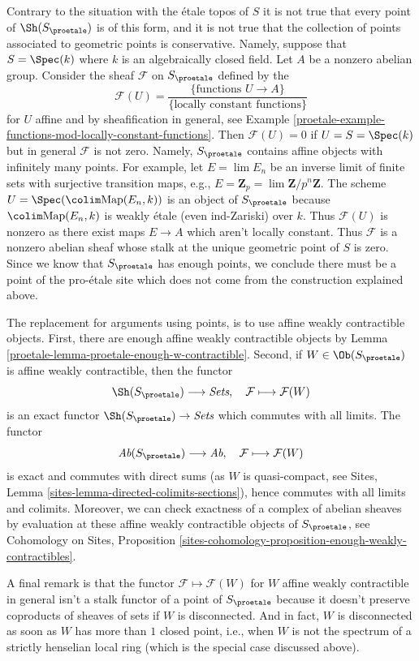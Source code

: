 Contrary to the situation with the \'etale topos of $S$ it is not true
that every point of $\Sh(S_\proetale)$ is of this form, and it is not
true that the collection of points associated to geometric points is
conservative. Namely, suppose that $S = \Spec(k)$ where $k$ is an
algebraically closed field. Let $A$ be a nonzero abelian group.
Consider the sheaf $\mathcal{F}$ on $S_\proetale$ defined by the
$$
\mathcal{F}(U) =
\frac{\{\text{functions }U \to A\}}{\{\text{locally constant functions}\}}
$$
for $U$ affine and by sheafification in general, see
Example \ref{proetale-example-functions-mod-locally-constant-functions}.
Then $\mathcal{F}(U) = 0$ if $U = S = \Spec(k)$ but in general $\mathcal{F}$
is not zero. Namely, $S_\proetale$ contains affine objects
with infinitely many points. For example, let $E = \lim E_n$
be an inverse limit of finite sets with surjective transition maps,
e.g., $E = \mathbf{Z}_p = \lim \mathbf{Z}/p^n\mathbf{Z}$. The scheme
$U = \Spec(\colim \text{Map}(E_n, k))$ is an object of $S_\proetale$
because $\colim \text{Map}(E_n, k)$ is weakly \'etale (even ind-Zariski)
over $k$. Thus $\mathcal{F}(U)$ is nonzero as there exist maps $E \to A$
which aren't locally constant.
Thus $\mathcal{F}$ is a nonzero abelian sheaf whose stalk at the
unique geometric point of $S$ is zero. Since we know that $S_\proetale$
has enough points, we conclude there must be a point of the pro-\'etale
site which does not come from the construction explained above.

\medskip\noindent
The replacement for arguments using points, is to use affine
weakly contractible objects.
First, there are enough affine weakly contractible objects by
Lemma \ref{proetale-lemma-proetale-enough-w-contractible}.
Second, if $W \in \Ob(S_\proetale)$ is affine weakly contractible,
then the functor
$$
\Sh(S_\proetale) \longrightarrow \textit{Sets},\quad
\mathcal{F} \longmapsto \mathcal{F}(W)
$$
is an exact functor $\Sh(S_\proetale) \to \textit{Sets}$ which commutes
with all limits. The functor
$$
\textit{Ab}(S_\proetale) \longrightarrow \textit{Ab},\quad
\mathcal{F} \longmapsto \mathcal{F}(W)
$$
is exact and commutes with direct sums (as $W$ is quasi-compact, see
Sites, Lemma \ref{sites-lemma-directed-colimits-sections}), hence
commutes with all limits and colimits. Moreover, we can check exactness of
a complex of abelian sheaves by evaluation at these affine
weakly contractible objects of $S_\proetale$, see
Cohomology on Sites, Proposition
\ref{sites-cohomology-proposition-enough-weakly-contractibles}.

\medskip\noindent
A final remark is that the functor $\mathcal{F} \mapsto \mathcal{F}(W)$
for $W$ affine weakly contractible in general isn't a stalk functor of a
point of $S_\proetale$ because it doesn't preserve coproducts of sheaves of
sets if $W$ is disconnected. And in fact, $W$ is disconnected as soon as $W$
has more than $1$ closed point, i.e., when $W$ is not the spectrum of a
strictly henselian local ring (which is the special case discussed above).

